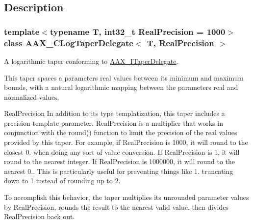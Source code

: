 \subsection{Description}
\subsubsection*{template$<$typename T, int32\+\_\+t Real\+Precision = 1000$>$\newline
class A\+A\+X\+\_\+\+C\+Log\+Taper\+Delegate$<$ T, Real\+Precision $>$}

A logarithmic taper conforming to \mbox{\hyperlink{a01881}{A\+A\+X\+\_\+\+I\+Taper\+Delegate}}. 

This taper spaces a parameter\textquotesingle{}s real values between its minimum and maximum bounds, with a natural logarithmic mapping between the parameter\textquotesingle{}s real and normalized values.

\begin{DoxyParagraph}{Real\+Precision}
In addition to its type templatization, this taper includes a precision template parameter. Real\+Precision is a multiplier that works in conjunction with the round() function to limit the precision of the real values provided by this taper. For example, if Real\+Precision is 1000, it will round to the closest 0. when doing any sort of value conversion. If Real\+Precision is 1, it will round to the nearest integer. If Real\+Precision is 1000000, it will round to the nearest 0.. This is particularly useful for preventing things like 1. truncating down to 1 instead of rounding up to 2.
\end{DoxyParagraph}
To accomplish this behavior, the taper multiplies its unrounded parameter values by Real\+Precision, rounds the result to the nearest valid value, then divides Real\+Precision back out.

